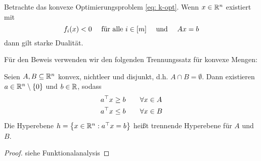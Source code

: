 \begin{theorem} \label{theorem: 4.2}
	Betrachte das konvexe Optimierungsproblem \eqref{eq: k-opt}. Wenn $x \in \mathbb{R}^n$ existiert mit 
	\begin{equation*}
		f_i(x) < 0 \quad  \text{ für alle } i \in [m] \quad \text{ und } \quad Ax = b
	\end{equation*}
	dann gilt starke Dualität.
\end{theorem}

Für den Beweis verwenden wir den folgenden Trennungssatz für konvexe Mengen:
\begin{theorem}
	Seien $A,B \subseteq \mathbb{R}^n$ konvex,  nichtleer und disjunkt, d.h. $A \cap B = \emptyset$. Dann existieren $a \in \mathbb{R}^n \setminus \left\{ 0 \right\}$ und $b \in \mathbb{R}$, sodass 
	\begin{equation*}
		\begin{aligned}
		a^{\top} x &\ge b \qquad \forall x \in A \\
		a^{\top} x &\le b \qquad \forall x \in B
		\end{aligned}
	\end{equation*}
	Die Hyperebene $h = \left\{ x \in \mathbb{R}^n : a^{\top}x = b \right\}$ heißt trennende Hyperebene für $A$ und $B$.
\end{theorem}
\begin{proof}
	siehe Funktionalanalysis
\end{proof}


